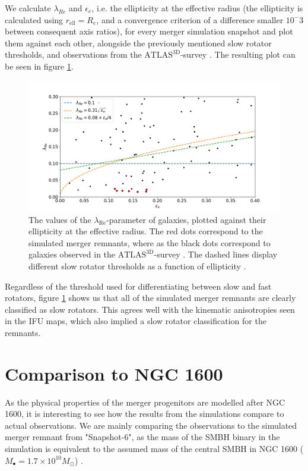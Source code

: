 \documentclass[english, oneside]{HYgradu}
\begin{document}
We calculate $\lambda_{Re}$ and $\epsilon_e$, i.e. the ellipticity at the effective radius (the ellipticity is calculated using $r_\mathrm{ell} = R_e$, and a convergence criterion of a difference smaller $10^-3$ between consequent axis ratios), for every merger simulation snapshot and plot them against each other, alongside the previously mentioned slow rotator thresholds, and observations from the $\mathrm{ATLAS^{3D}}$-survey \citep{Cappellari2011}. The resulting plot can be seen in figure \ref{figure:lambda_epsilon}. 

\begin{figure}[h]
	\centering
	\includegraphics[width=\textwidth]{lambda_epsilon.png}
	\caption{The values of the $\lambda_{\mathrm{Re}}$-parameter of galaxies, plotted against their ellipticity at the effective radius. The red dots correspond to the simulated merger remnants, where as the black dots correspond to galaxies observed in the $\mathrm{ATLAS^{3D}}$-survey \citep{Cappellari2011, Emsellem2011}. The dashed lines display different slow rotator thresholds as a function of ellipticity \citep{Emsellem2007, Emsellem2011, Cappellari2016}.}
	\label{figure:lambda_epsilon}
\end{figure}

Regardless of the threshold used for differentiating between slow and fast rotators, figure \ref{figure:lambda_epsilon} shows us that all of the simulated merger remnants are clearly classified as slow rotators. This agrees well with the kinematic anisotropies seen in the IFU maps, which also implied a slow rotator classification for the remnants.

\section{Comparison to NGC 1600}

As the physical properties of the merger progenitors are modelled after NGC 1600, it is interesting to see how the results from the simulations compare to actual observations. We are mainly comparing the observations to the simulated merger remnant from "Snapshot-6", as the mass of the SMBH binary in the simulation is equivalent to the assumed mass of the central SMBH in NGC 1600 ($M_\bullet = 1.7 \times 10^{10} M_\odot$) \citep{Thomas2016}.
\end{document}
